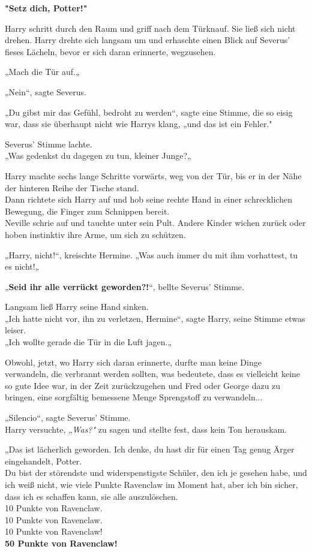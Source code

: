 {\textbf{"Setz dich, Potter!"}

Harry schritt durch den Raum und griff nach dem Türknauf. Sie ließ sich nicht drehen. Harry drehte sich langsam um und erhaschte einen Blick auf Severus' fieses Lächeln, bevor er sich daran erinnerte, wegzusehen.

„Mach die Tür auf.„

„Nein“, sagte Severus.

„Du gibst mir das Gefühl, bedroht zu werden“, sagte eine Stimme, die so eisig war, dass sie überhaupt nicht wie Harrys klang, „und das ist ein Fehler."

Severus' Stimme lachte.\\ „Was gedenkst du dagegen zu tun, kleiner Junge?„

Harry machte sechs lange Schritte vorwärts, weg von der Tür, bis er in der Nähe der hinteren Reihe der Tische stand.\\ Dann richtete sich Harry auf und hob seine rechte Hand in einer schrecklichen Bewegung, die Finger zum Schnippen bereit.\\ Neville schrie auf und tauchte unter sein Pult. Andere Kinder wichen zurück oder hoben instinktiv ihre Arme, um sich zu schützen.

„Harry, nicht!“, kreischte Hermine. „Was auch immer du mit ihm vorhattest, tu es nicht!„

„\textbf{Seid ihr alle verrückt geworden?!}“, bellte Severus' Stimme.

Langsam ließ Harry seine Hand sinken.\\ „Ich hatte nicht vor, ihn zu verletzen, Hermine“, sagte Harry, seine Stimme etwas leiser.\\ „Ich wollte gerade die Tür in die Luft jagen.„

Obwohl, jetzt, wo Harry sich daran erinnerte, durfte man keine Dinge verwandeln, die verbrannt werden sollten, was bedeutete, dass es vielleicht keine so gute Idee war, in der Zeit zurückzugehen und Fred oder George dazu zu bringen, eine sorgfältig bemessene Menge Sprengstoff zu verwandeln...

„Silencio“, sagte Severus' Stimme.\\ Harry versuchte, „\emph{Was?"} zu sagen und stellte fest, dass kein Ton herauskam.

„Das ist lächerlich geworden. Ich denke, du hast dir für einen Tag genug Ärger eingehandelt, Potter.\\ Du bist der störendste und widerspenstigste Schüler, den ich je gesehen habe, und ich weiß nicht, wie viele Punkte Ravenclaw im Moment hat, aber ich bin sicher, dass ich es schaffen kann, sie alle auszulöschen.\\ 10 Punkte von Ravenclaw.\\ 10 Punkte von Ravenclaw.\\ 10 Punkte von Ravenclaw!\\ \textbf{50 Punkte von Ravenclaw!}

}
